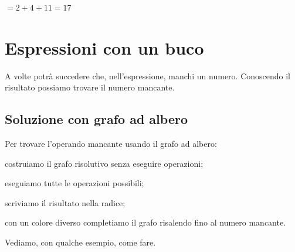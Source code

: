 \(= 2 + 4 + 11 = 17\)

\section{Espressioni con un buco}
\label{sec:01_espressioni_buco}

A volte potrà succedere che, nell'espressione, manchi un numero.
Conoscendo il risultato possiamo trovare il numero mancante.

\subsection{Soluzione con grafo ad albero}

\begin{procedura}
 Per trovare l'operando mancante usando il grafo ad albero:
\begin{enumerate*}
 \item costruiamo il grafo risolutivo senza eseguire operazioni;
 \item eseguiamo tutte le operazioni possibili;
 \item scriviamo il risultato nella radice;
 \item con un colore diverso completiamo il grafo risalendo fino al numero 
  mancante.
\end{enumerate*}
\end{procedura}

Vediamo, con qualche esempio, come fare.

